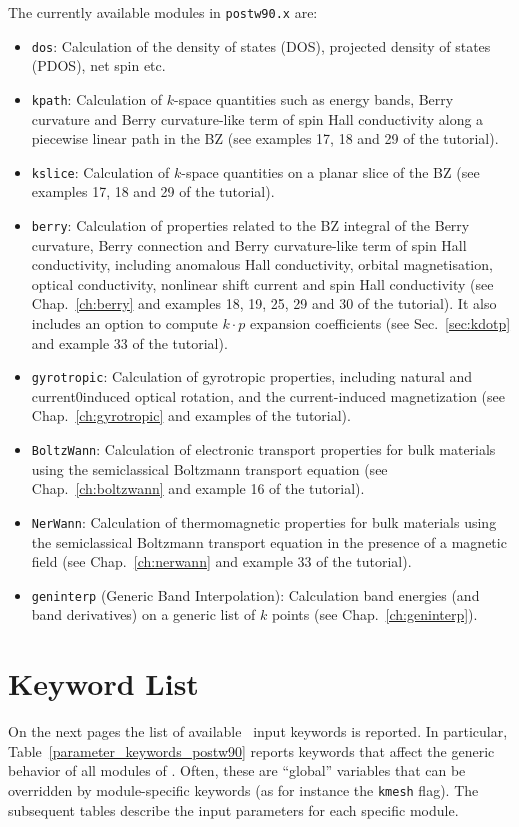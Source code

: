 The currently available modules in \texttt{postw90.x} are:
\begin{itemize}
\item \texttt{dos}: Calculation of the density of states (DOS), projected
  density of states (PDOS), net spin etc.
\item \texttt{kpath}: Calculation of $k$-space quantities such as
  energy bands, Berry curvature and Berry curvature-like term 
  of spin Hall conductivity along a piecewise linear path in
  the BZ (see examples 17, 18 and 29 of the tutorial).
\item \texttt{kslice}: Calculation of $k$-space quantities on a planar
  slice of the BZ (see examples 17, 18 and 29 of the tutorial).
\item \texttt{berry}: Calculation of properties related to the BZ
  integral of the Berry curvature, Berry connection and 
  Berry curvature-like term of spin Hall conductivity, including
  anomalous Hall conductivity, orbital magnetisation, optical
  conductivity, nonlinear shift current and spin Hall conductivity
  (see Chap.~\ref{ch:berry} and examples 18, 19, 25, 29 and 30 of the
  tutorial). It also includes an option to compute $k\cdot p$ expansion coefficients
  (see Sec.~\ref{sec:kdotp} and example 33 of the tutorial).
\item \texttt{gyrotropic}: Calculation of gyrotropic properties, 
    including natural and current0induced optical rotation, 
and the current-induced magnetization
   (see Chap.~\ref{ch:gyrotropic} and examples  of the
  tutorial).
\item \texttt{BoltzWann}: Calculation of electronic transport
  properties for bulk materials using the semiclassical Boltzmann
  transport equation (see Chap.~\ref{ch:boltzwann} and example 16 of
  the tutorial).
  \item \texttt{NerWann}: Calculation of thermomagnetic properties for bulk materials using the semiclassical Boltzmann transport equation in the presence of a magnetic field (see Chap.~\ref{ch:nerwann} and example 33 of
  the tutorial).
\item \texttt{geninterp} (Generic Band Interpolation): Calculation band energies (and band
  derivatives) on a generic list of $k$ points (see Chap.~\ref{ch:geninterp}).
\end{itemize}


\section{Keyword List}
On the next pages the list of available \postw\ input keywords is
reported.  In particular, Table~\ref{parameter_keywords_postw90}
reports keywords that affect the generic behavior of all modules of
\postw. Often, these are ``global'' variables that can be overridden
by module-specific keywords (as for instance the {\tt kmesh}
flag). The subsequent tables describe the input parameters for each
specific module.

